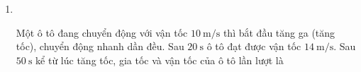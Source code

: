 \begin{enumerate}[label=\bfseries Câu \arabic*:]
{}

\item {}\\
{Một ô tô đang chuyển động với vận tốc $\SI{10}{\meter/\second}$ thì bắt đầu tăng ga (tăng tốc), chuyển động nhanh dần đều. Sau $\SI{20}{\second}$ ô tô đạt được vận tốc $\SI{14}{\meter/\second}$. Sau $\SI{50}{\second}$ kể từ lúc tăng tốc, gia tốc và vận tốc của ô tô lần lượt là
}


\end{enumerate}
